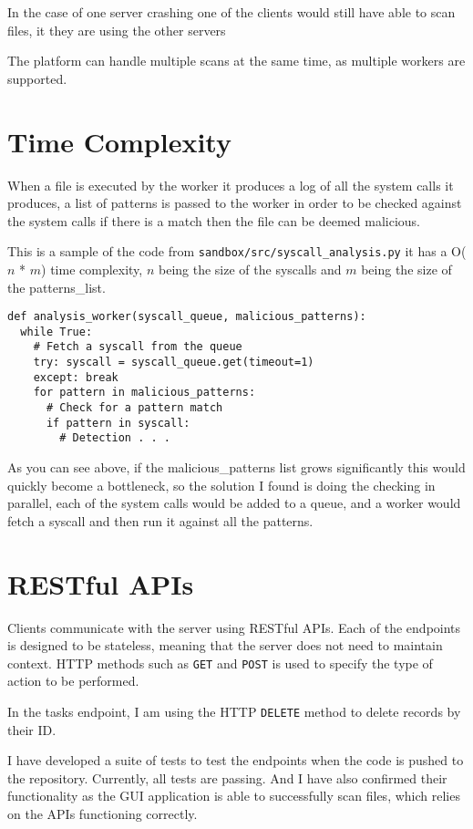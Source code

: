 In the case of one server crashing one of the clients would still have able to scan files, it they are using the other servers

The platform can handle multiple scans at the same time, as multiple workers are supported.

\section{Time Complexity}
When a file is executed by the worker it produces a log of all the
system calls it produces, a list of patterns is passed to
the worker in order to be checked against the system calls
if there is a match then the file can be deemed malicious.

This is a sample of the code from \texttt{sandbox/src/syscall\_analysis.py}
it has a O($n$ * $m$) time complexity, $n$ being the size of the syscalls
and $m$ being the size of the patterns\_list.
\begin{lstlisting}
def analysis_worker(syscall_queue, malicious_patterns):
  while True:
    # Fetch a syscall from the queue
    try: syscall = syscall_queue.get(timeout=1)
    except: break
    for pattern in malicious_patterns:
      # Check for a pattern match
      if pattern in syscall:
        # Detection . . .
\end{lstlisting}

As you can see above, if the malicious\_patterns list grows
significantly this would quickly become a bottleneck,
so the solution I found is doing the checking in parallel,
each of the system calls would be added to a queue,
and a worker would fetch a syscall and then run it against all the patterns.

\section{RESTful APIs}
Clients communicate with the server using RESTful APIs.
Each of the endpoints is designed to be stateless,
meaning that the server does not need to maintain context.
HTTP methods such as \texttt{GET} and \texttt{POST} is used
to specify the type of action to be performed.

In the tasks endpoint, I am using the HTTP \texttt{DELETE}
method to delete records by their ID.

I have developed a suite of tests to test
the endpoints when the code is pushed to the repository.
Currently, all tests are passing. And I have also confirmed their functionality
as the GUI application is able to successfully scan files,
which relies on the APIs functioning correctly.

